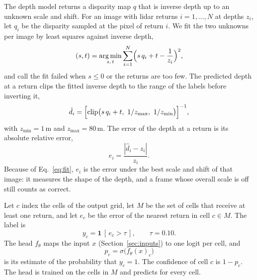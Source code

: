 The depth model returns a disparity map $q$ that is inverse depth up to an unknown scale and shift. For an image with lidar returns $i = 1, \dots, N$ at depths $z_i$, let $q_i$ be the disparity sampled at the pixel of return $i$. We fit the two unknowns per image by least squares against inverse depth,
\begin{equation}
  (s, t) = \operatorname*{arg\,min}_{s,\,t} \sum_{i=1}^{N} \Bigl( s\,q_i + t - \frac{1}{z_i} \Bigr)^{2},
  \label{eq:fit}
\end{equation}
and call the fit failed when $s \le 0$ or the returns are too few. The predicted depth at a return clips the fitted inverse depth to the range of the labels before inverting it,
\begin{equation}
  \hat d_i = \Bigl[ \operatorname{clip}\bigl( s\,q_i + t,\ 1/z_{\max},\ 1/z_{\min} \bigr) \Bigr]^{-1},
  \label{eq:depth}
\end{equation}
with $z_{\min} = 1$\,m and $z_{\max} = 80$\,m. The error of the depth at a return is its absolute relative error,
\begin{equation}
  e_i = \frac{|\hat d_i - z_i|}{z_i}.
  \label{eq:absrel}
\end{equation}
Because of Eq.~\ref{eq:fit}, $e_i$ is the error under the best scale and shift of that image: it measures the shape of the depth, and a frame whose overall scale is off still counts as correct.

Let $c$ index the cells of the output grid, let $M$ be the set of cells that receive at least one return, and let $e_c$ be the error of the nearest return in cell $c \in M$. The label is
\begin{equation}
  y_c = \mathbf{1}\,[\, e_c > \tau \,], \qquad \tau = 0.10 .
  \label{eq:label}
\end{equation}
The head $f_\theta$ maps the input $x$ (Section~\ref{sec:inputs}) to one logit per cell, and
\begin{equation}
  p_c = \sigma\bigl( f_\theta(x)_c \bigr)
  \label{eq:perror}
\end{equation}
is its estimate of the probability that $y_c = 1$. The confidence of cell $c$ is $1 - p_c$. The head is trained on the cells in $M$ and predicts for every cell.


